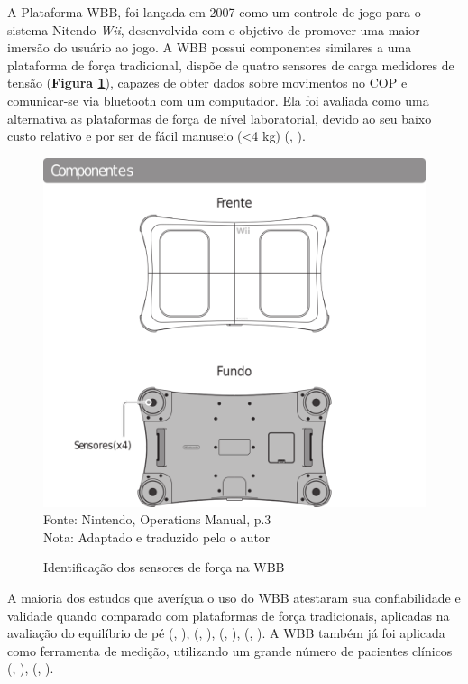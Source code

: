 A Plataforma WBB, foi lançada em 2007 como um controle de jogo para o sistema Nitendo \textit{Wii}, desenvolvida com o objetivo de promover uma maior imersão do usuário ao jogo. A WBB possui componentes similares a uma plataforma de força tradicional, dispõe de quatro sensores de carga medidores de tensão (\textbf{Figura \ref{sensoresWBB}}), capazes de obter dados sobre movimentos no COP e comunicar-se via bluetooth com um computador. Ela foi avaliada como uma alternativa as plataformas de força de nível laboratorial, devido ao seu baixo custo relativo e por ser de fácil manuseio (<4 kg) (\citeauthor{clark2018reliability}, \citeyear{clark2018reliability}).


\begin{figure}
\captionsetup{justification   = raggedright,
              singlelinecheck = false}
\caption{Identificação dos sensores de força na WBB}\label{sensoresWBB}
\includegraphics[width=1.0\textwidth]{WBB.png}
\footnotesize Fonte: Nintendo, Operations Manual, p.3
\\\footnotesize Nota: Adaptado e traduzido pelo o autor
\end{figure}

A maioria dos estudos que averígua o uso do WBB atestaram sua confiabilidade e validade quando comparado com plataformas de força tradicionais, aplicadas na avaliação do equilíbrio de pé (\citeauthor{clark2010validity}, \citeyear{clark2010validity}),  (\citeauthor{young2011assessing}, \citeyear{young2011assessing}), (\citeauthor{huurnink2013comparison}, \citeyear{huurnink2013comparison}), (\citeauthor{leach2014validating}, \citeyear{leach2014validating}). A WBB também já foi aplicada como ferramenta de medição, utilizando um grande número de pacientes clínicos (\citeauthor{clark2017standing}, \citeyear{clark2017standing}), (\citeauthor{clark2017standing414}, \citeyear{clark2017standing414}).


